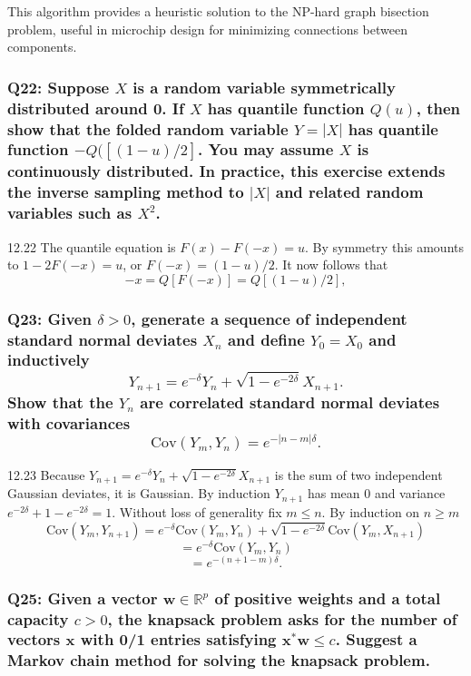 \documentclass[8pt]{article}
\begin{document}
This algorithm provides a heuristic solution to the NP-hard graph bisection problem, useful in microchip design for minimizing connections between components.

\subsubsection*{Q22: Suppose \(X\) is a random variable symmetrically distributed around 0. If \(X\) has quantile function \(Q(u)\), then show that the folded random variable \(Y = |X|\) has quantile function \(-Q([(1-u)/2]\). You may assume \(X\) is continuously distributed. In practice, this exercise extends the inverse sampling method to \(|X|\) and related random variables such as \(X^2\).}

12.22 The quantile equation is \( F(x) - F(-x) = u \). By symmetry this amounts to \( 1 - 2F(-x) = u \), or \( F(-x) = (1 - u)/2 \). It now follows that
\[
-x = Q[F(-x)] = Q[(1 - u)/2],
\]

\subsubsection*{Q23: Given \(\delta > 0\), generate a sequence of independent standard normal deviates \(X_n\) and define \(Y_0 = X_0\) and inductively
\[
Y_{n+1} = e^{-\delta} Y_n + \sqrt{1 - e^{-2\delta}} X_{n+1}.
\]
Show that the \(Y_n\) are correlated standard normal deviates with covariances
\[
\text{Cov}(Y_m, Y_n) = e^{-|n-m|\delta}.
\]}

12.23 Because \( Y_{n+1} = e^{-\delta}Y_n + \sqrt{1 - e^{-2\delta}}X_{n+1} \) is the sum of two independent Gaussian deviates, it is Gaussian. By induction \( Y_{n+1} \) has mean 0 and variance \( e^{-2\delta} + 1 - e^{-2\delta} = 1 \). Without loss of generality fix \( m \leq n \). By induction on \( n \geq m \)
\[
\text{Cov}(Y_m, Y_{n+1}) = e^{-\delta} \text{Cov}(Y_m, Y_n) + \sqrt{1 - e^{-2\delta}} \text{Cov}(Y_m, X_{n+1})
\]
\[
= e^{-\delta} \text{Cov}(Y_m, Y_n)
\]
\[
= e^{-(n+1-m)\delta}.
\]

\subsubsection*{Q25: Given a vector \( \mathbf{w} \in \mathbb{R}^p \) of positive weights and a total capacity \( c > 0 \), the knapsack problem asks for the number of vectors \( \mathbf{x} \) with 0/1 entries satisfying \( \mathbf{x}^* \mathbf{w} \leq c \). Suggest a Markov chain method for solving the knapsack problem.}
\end{document}

